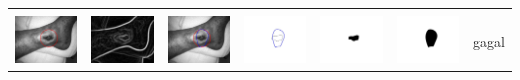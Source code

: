 \begin{table}[H]
\begin{tabular}{|m{0.7in}|m{0.7in}|m{0.7in}|m{0.7in}|m{0.7in}|m{0.7in}|m{0.7in}|}
		&  &  & & & &  \\
		\includegraphics[width=0.7in]{dataset/dataset_3/luka_merah/ready/18_interp_init.jpg}&
		\includegraphics[width=0.7in]{dataset/dataset_3/luka_merah/ready/18_interp_ext.jpg}&
		\includegraphics[width=0.7in]{dataset/dataset_3/luka_merah/ready/18_interp_result.jpg}&
		\includegraphics[width=0.7in]{dataset/dataset_3/luka_merah/ready/18_gt_r.jpg}&
		\includegraphics[width=0.7in]{dataset/dataset_3/luka_merah/ready/18_r.jpg}&
		\includegraphics[width=0.7in]{dataset/dataset_3/luka_merah/ready/18_interp_r.jpg}&
		gagal\\
		\hline
		

\end{tabular}
\end{table}
